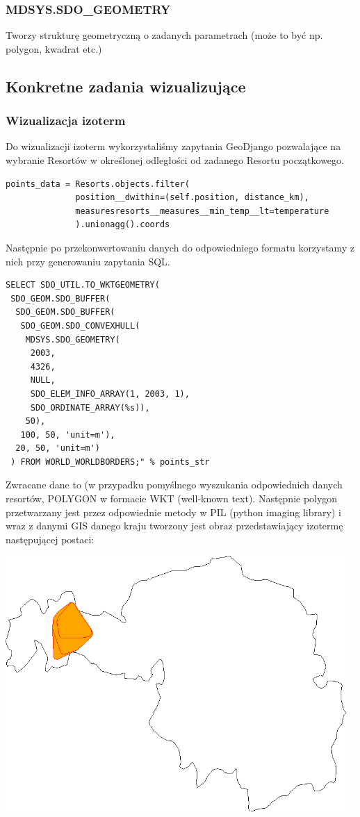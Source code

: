 \documentclass[12pt]{article}
\begin{document}
\subsubsection{MDSYS.SDO\_GEOMETRY}
Tworzy strukturę geometryczną o zadanych parametrach (może to być np. polygon, kwadrat etc.)

\subsection{Konkretne zadania wizualizujące}
\subsubsection{Wizualizacja izoterm}
Do wizualizacji izoterm wykorzystaliśmy zapytania GeoDjango pozwalające na wybranie Resortów w określonej odległości od zadanego Resortu początkowego.

\begin{verbatim}
points_data = Resorts.objects.filter(
              position__dwithin=(self.position, distance_km),
              measuresresorts__measures__min_temp__lt=temperature
              ).unionagg().coords
\end{verbatim}

Następnie po przekonwertowaniu danych do odpowiedniego formatu korzystamy z nich przy generowaniu zapytania SQL.

\begin{verbatim}
SELECT SDO_UTIL.TO_WKTGEOMETRY(
 SDO_GEOM.SDO_BUFFER(
  SDO_GEOM.SDO_BUFFER(
   SDO_GEOM.SDO_CONVEXHULL(
    MDSYS.SDO_GEOMETRY(
     2003,
     4326,
     NULL,
     SDO_ELEM_INFO_ARRAY(1, 2003, 1),
     SDO_ORDINATE_ARRAY(%s)),
    50),
   100, 50, 'unit=m'),
  20, 50, 'unit=m')
 ) FROM WORLD_WORLDBORDERS;" % points_str
\end{verbatim}

Zwracane dane to (w przypadku pomyślnego wyszukania odpowiednich danych resortów, POLYGON w formacie WKT (well-known text). Następnie polygon przetwarzany jest przez odpowiednie metody w PIL (python imaging library) i wraz z danymi GIS danego kraju tworzony jest obraz przedstawiający izotermę następującej postaci:

\includegraphics[width=35em]{images/isotherm.png}
\end{document}
